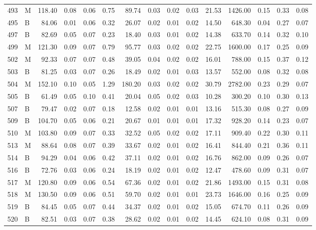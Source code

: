 \begin{table}[ht]
\begin{tabular}{rlrrrrrrrrrrrrr}
  493 & M & 118.40 & 0.08 & 0.06 & 0.75 & 89.74 & 0.03 & 0.02 & 0.03 & 21.53 & 1426.00 & 0.15 & 0.33 & 0.08 \\ 
  495 & B & 84.06 & 0.01 & 0.06 & 0.32 & 26.07 & 0.02 & 0.01 & 0.02 & 14.50 & 648.30 & 0.04 & 0.27 & 0.07 \\ 
  497 & B & 82.69 & 0.05 & 0.07 & 0.23 & 18.40 & 0.03 & 0.01 & 0.02 & 14.38 & 633.70 & 0.14 & 0.32 & 0.10 \\ 
  499 & M & 121.30 & 0.09 & 0.07 & 0.79 & 95.77 & 0.03 & 0.02 & 0.02 & 22.75 & 1600.00 & 0.17 & 0.25 & 0.09 \\ 
  502 & M & 92.33 & 0.07 & 0.07 & 0.48 & 39.05 & 0.04 & 0.02 & 0.02 & 16.01 & 788.00 & 0.15 & 0.37 & 0.12 \\ 
  503 & B & 81.25 & 0.03 & 0.07 & 0.26 & 18.49 & 0.02 & 0.01 & 0.03 & 13.57 & 552.00 & 0.08 & 0.32 & 0.08 \\ 
  504 & M & 152.10 & 0.10 & 0.05 & 1.29 & 180.20 & 0.03 & 0.02 & 0.02 & 30.79 & 2782.00 & 0.23 & 0.29 & 0.07 \\ 
  505 & B & 61.49 & 0.05 & 0.10 & 0.41 & 20.04 & 0.05 & 0.02 & 0.03 & 10.28 & 300.20 & 0.10 & 0.30 & 0.13 \\ 
  507 & B & 79.47 & 0.02 & 0.07 & 0.18 & 12.58 & 0.02 & 0.01 & 0.01 & 13.16 & 515.30 & 0.08 & 0.27 & 0.09 \\ 
  509 & B & 104.70 & 0.05 & 0.06 & 0.21 & 20.67 & 0.01 & 0.01 & 0.01 & 17.32 & 928.20 & 0.14 & 0.23 & 0.07 \\ 
  510 & M & 103.80 & 0.09 & 0.07 & 0.33 & 32.52 & 0.05 & 0.02 & 0.02 & 17.11 & 909.40 & 0.22 & 0.30 & 0.11 \\ 
  513 & M & 88.64 & 0.08 & 0.07 & 0.39 & 33.67 & 0.02 & 0.01 & 0.02 & 16.41 & 844.40 & 0.21 & 0.36 & 0.11 \\ 
  514 & B & 94.29 & 0.04 & 0.06 & 0.42 & 37.11 & 0.02 & 0.01 & 0.02 & 16.76 & 862.00 & 0.09 & 0.26 & 0.07 \\ 
  516 & B & 72.76 & 0.03 & 0.06 & 0.24 & 18.19 & 0.02 & 0.01 & 0.02 & 12.47 & 478.60 & 0.09 & 0.31 & 0.07 \\ 
  517 & M & 120.80 & 0.09 & 0.06 & 0.54 & 67.36 & 0.02 & 0.01 & 0.02 & 21.86 & 1493.00 & 0.15 & 0.31 & 0.08 \\ 
  518 & M & 130.50 & 0.09 & 0.06 & 0.51 & 59.70 & 0.02 & 0.01 & 0.01 & 23.73 & 1646.00 & 0.16 & 0.25 & 0.09 \\ 
  519 & B & 84.45 & 0.05 & 0.07 & 0.44 & 34.37 & 0.02 & 0.01 & 0.02 & 15.05 & 674.70 & 0.11 & 0.26 & 0.09 \\ 
  520 & B & 82.51 & 0.03 & 0.07 & 0.38 & 28.62 & 0.02 & 0.01 & 0.02 & 14.45 & 624.10 & 0.08 & 0.31 & 0.09 \\ 

\end{tabular}
\end{table}
